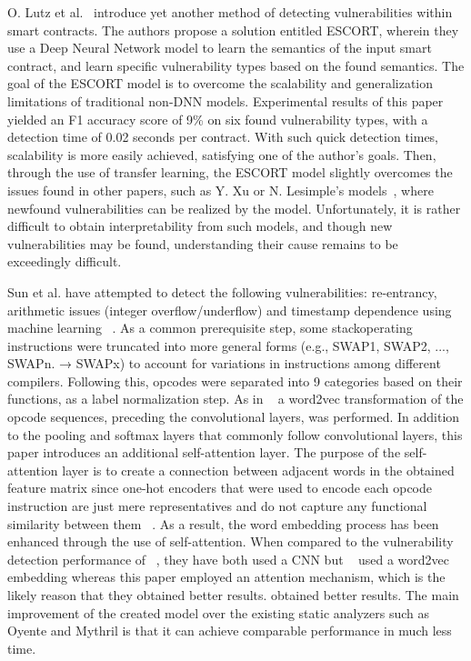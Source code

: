 O. Lutz et al.~\cite{dolan2016lava} introduce yet another method of detecting vulnerabilities within smart contracts.
The authors propose a solution entitled ESCORT, wherein they use a Deep Neural Network model to learn the semantics of the input smart contract,
and learn specific vulnerability types based on the found semantics.
The goal of the ESCORT model is to overcome the scalability and generalization limitations of traditional non-DNN models.
Experimental results of this paper yielded an F1 accuracy score of 9\% on six found vulnerability types, with a detection time of 0.02 seconds per contract.
With such quick detection times, scalability is more easily achieved, satisfying one of the author's goals.
Then, through the use of transfer learning, the ESCORT model slightly overcomes the issues found in other papers, such as Y. Xu or N. Lesimple's models~\cite{grech2019gigahorse},
where newfound vulnerabilities can be realized by the model.
Unfortunately, it is rather difficult to obtain interpretability from such models, and though new vulnerabilities may be found, understanding their cause remains to be exceedingly difficult.

Sun et al. have attempted to detect the following vulnerabilities: re-entrancy, arithmetic issues (integer overflow/underflow) and timestamp dependence using machine learning ~\cite{grech2019gigahorse}.
As a common prerequisite step, some stackoperating instructions were truncated into more general forms (e.g., SWAP1, SWAP2, ..., SWAPn. → SWAPx) to account for variations in instructions
among different compilers.
Following this, opcodes were separated into 9 categories based on their functions, as a label normalization step.
As in ~\cite{etehrTrust} a word2vec transformation of the opcode sequences, preceding the convolutional layers, was performed.
In addition to the pooling and softmax layers that commonly follow convolutional layers, this paper introduces an additional self-attention layer.
The purpose of the self-attention layer is to create a connection between adjacent words in the obtained feature matrix since one-hot encoders that were used to encode each opcode instruction
are just mere representatives and do not capture any functional similarity between them ~\cite{grech2019gigahorse}.
As a result, the word embedding process has been enhanced through the use of self-attention.
When compared to the vulnerability detection performance of ~\cite{etehrTrust}, they have both used a CNN but ~\cite{etehrTrust} used a word2vec embedding whereas this paper employed an
attention mechanism, which is the likely reason that they obtained better results.
obtained better results. The main improvement of the created model over the existing static analyzers such as Oyente and Mythril is that it can achieve comparable performance in much less time.

